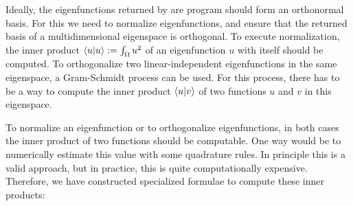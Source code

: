 Ideally, the eigenfunctions returned by are program should form an orthonormal basis. For this we need to normalize eigenfunctions, and ensure that the returned basis of a multidimensional eigenspace is orthogonal. To execute normalization, the inner product $\bra{u}\ket{u} := \int_\Omega u^2$  of an eigenfunction $u$ with itself should be computed. To orthogonalize two linear-independent eigenfunctions in the same eigenspace, a Gram-Schmidt process can be used. For this process, there has to be a way to compute the inner product $\bra{u}\ket{v}$ of two functions $u$ and $v$ in this eigenspace.

To normalize an eigenfunction or to orthogonalize eigenfunctions, in both cases the inner product of two functions should be computable. One way would be to numerically estimate this value with some quadrature rules. In principle this is a valid approach, but in practice, this is quite computationally expensive. Therefore, we have constructed specialized formulae to compute these inner products:


